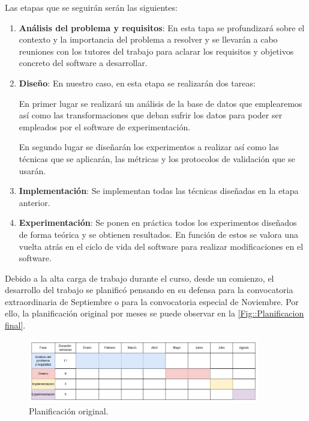     \medskip

    \noindent Las etapas que se seguirán serán las siguientes:

    \begin{enumerate}
        \item \textbf{Análisis del problema y requisitos}: En esta tapa se profundizará sobre el contexto y la importancia del problema a resolver y se llevarán a cabo reuniones con los tutores del trabajo para aclarar los requisitos y objetivos concreto del software a desarrollar. 
        \item \textbf{Diseño}: En nuestro caso, en esta etapa se realizarán dos tareas: 
        
        En primer lugar se realizará un análisis de la base de datos que emplearemos así como las transformaciones que deban sufrir los datos para poder ser empleados por el software de experimentación. 

        En segundo lugar se diseñarán los experimentos a realizar así como las técnicas que se aplicarán, las métricas y los protocolos de validación que se usarán.

        \item \textbf{Implementación}: Se implementan todas las técnicas diseñadas en la etapa anterior.
        \item \textbf{Experimentación}: Se ponen en práctica todos los experimentos diseñados de forma teórica y se obtienen resultados. En función de estos se valora una vuelta atrás en el ciclo de vida del software para realizar modificaciones en el software.
    \end{enumerate}
    
    \medskip

    \noindent Debido a la alta carga de trabajo durante el curso, desde un comienzo, el desarrollo del trabajo se planificó pensando en su defensa para la convocatoria extraordinaria de Septiembre o para la convocatoria especial de Noviembre. Por ello, la planificación original por meses se puede observar en la \autoref{Fig::Planificacion final}.


    \begin{figure}[!h]
        \centering
        \includegraphics[width=0.9\textwidth]{img/plan_provisional.png}
        \caption{Planificación original.}
        \label{Fig::Planificacion original}
    \end{figure}

